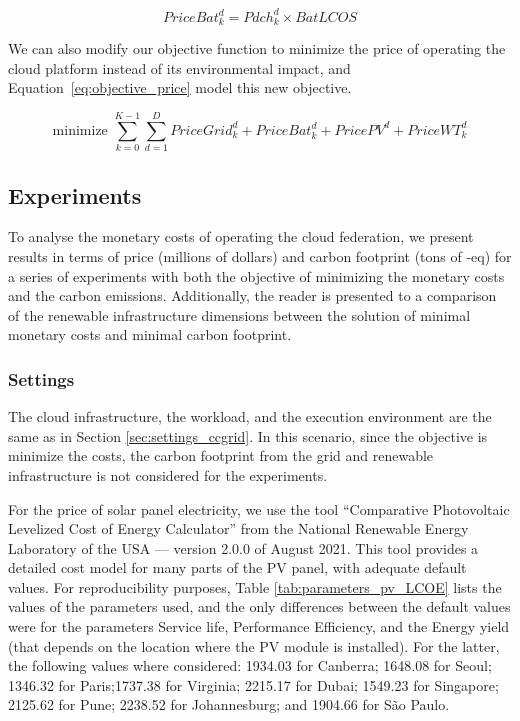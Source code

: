 \begin{equation} \label{eq:pricebat}
   PriceBat^d_k = Pdch^d_k \times BatLCOS
\end{equation}


We can also modify our objective function to minimize the price of operating the cloud platform instead of its environmental impact, and Equation~\eqref{eq:objective_price} model this new objective.

\begin{equation} \label{eq:objective_price}
\text{minimize }\sum_{k=0}^{K-1} \sum_{d=1}^D PriceGrid^d_k  + PriceBat^d_k + PricePV^d+ PriceWT^d_k
\end{equation}


\subsection{Experiments}

To analyse the monetary costs of operating the cloud federation, we present results in terms of price (millions of dollars) and carbon footprint (tons of -eq) for a series of experiments with both the objective of minimizing the monetary costs and the carbon emissions. Additionally, the reader is presented to a comparison of the renewable infrastructure dimensions between the solution of minimal monetary costs and minimal carbon footprint.


\subsubsection{Settings}

The cloud infrastructure, the workload, and the execution environment are the same as in Section  \ref{sec:settings_ccgrid}. In this scenario, since the objective is minimize the costs, the carbon footprint from the grid and renewable infrastructure is not considered for the experiments.

For the price of solar panel electricity, we use the tool ``Comparative Photovoltaic Levelized Cost of Energy Calculator'' from the National Renewable Energy Laboratory of the USA \cite{pv_lcoe_calc} --- version 2.0.0 of August 2021. This tool provides a detailed cost model for many parts of the PV panel, with adequate default values. For reproducibility purposes, Table \ref{tab:parameters_pv_LCOE} lists the values of the parameters used, and the only differences between the default values were for the parameters Service life, Performance Efficiency, and the Energy yield (that depends on the location where the PV module is installed). For the latter, the following values where considered:   1934.03 for Canberra;  1648.08 for Seoul; 1346.32 for Paris;1737.38 for Virginia; 2215.17 for Dubai; 1549.23 for Singapore; 2125.62 for Pune;  2238.52 for Johannesburg; and 1904.66 for São Paulo.

